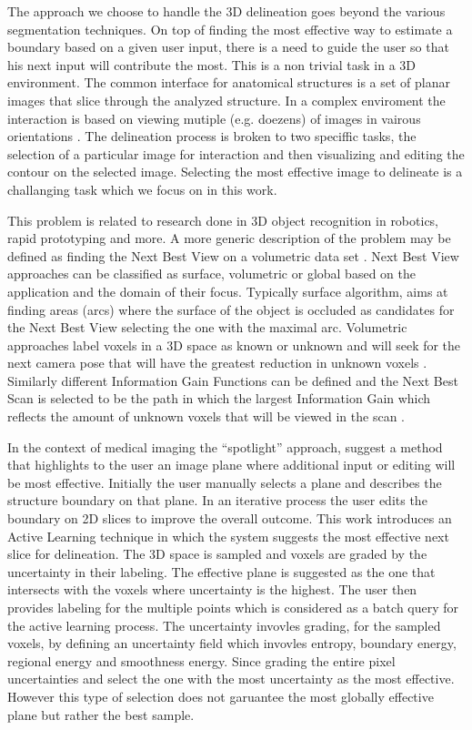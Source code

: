 The approach we choose to handle the 3D delineation goes beyond the various segmentation techniques. On top of finding the most effective way to estimate a boundary based on a given user input, there is a need to guide the user so that his next input will contribute the most. This is a non trivial task in a 3D environment. The common interface for anatomical structures is a set of planar images that slice through the analyzed structure. In a complex enviroment the interaction is based on viewing mutiple (e.g. doezens) of images in vairous orientations\cite{Top2011} . The delineation process is broken to two speciffic tasks, the selection of a particular image for interaction and then visualizing and editing the contour on the selected image. Selecting the most effective image to delineate is a challanging task which we focus on in this work.

This problem is related to research done in 3D object recognition in robotics, rapid prototyping and more. A more generic description of the problem may be defined as finding the Next Best View on a volumetric data set \cite{1087372} . Next Best View approaches can be classified as surface, volumetric or global based on the application and the domain of their focus.  Typically surface algorithm, aims at finding areas (arcs) where the surface of the object is occluded as candidates for the Next Best View \cite{MaverB93} selecting the one with the maximal arc. Volumetric approaches label voxels in a 3D space as known or unknown and will seek for the next camera pose that will have the greatest reduction in unknown voxels \cite{Banta95a}. Similarly different Information Gain Functions can be defined and the Next Best Scan is selected to be the path in which the largest Information Gain which reflects the amount of unknown voxels that will be viewed in the scan \cite{KriegelRBNSH12, Wong99nextbest}.

In the context of medical imaging the ``spotlight'' approach, \cite{Top2011} suggest a method that highlights to the user an image plane where additional input or editing will be most effective. Initially the user manually selects a plane and describes the structure boundary on that plane. In an iterative process the user edits the boundary on 2D slices to improve the overall outcome. This work introduces an Active Learning technique in which the system suggests the most effective next slice for delineation. The 3D space is sampled and voxels are graded by the uncertainty in their labeling. The effective plane is suggested as the one that intersects with the voxels where uncertainty is the highest. The user then provides labeling for the multiple points which is considered as a batch query for the active learning process. The uncertainty invovles grading, for the sampled voxels, by defining an uncertainty field which invovles entropy, boundary energy, regional energy and smoothness energy. Since grading the entire pixel uncertainties and select the one with the most uncertainty as the most effective. However this type of selection does not garuantee the most globally effective plane but rather the best sample.
